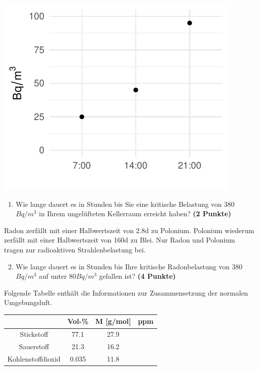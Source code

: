 \documentclass[a4paper, 9pt]{scrartcl}\usepackage[]{graphicx}\usepackage[]{xcolor}
\makeatletter
\def\maxwidth{ %
  \ifdim\Gin@nat@width>\linewidth
    \linewidth
  \else
    \Gin@nat@width
  \fi
}
\newenvironment{knitrout}{}{} %
\makeatother
\begin{document}
\begin{knitrout}
\color{fgcolor}

{\centering \includegraphics[width=\maxwidth]{img/math-10-1} 

}


\end{knitrout}

\vspace{-0.75cm}

\begin{enumerate}
\item Wie lange dauert es in Stunden bis Sie eine kritische Belastung von
  380$Bq/m^3$ in Ihrem ungelüfteten Kellerraum erreicht haben?
  \textbf{(2 Punkte)}
\end{enumerate}

Radon zerfällt mit einer Halbwertszeit von 2.8d zu
Polonium. Polonium wiederum zerfällt mit einer Halbwertszeit von
160d zu Blei. Nur Radon und Polonium tragen zur
radioaktiven Strahlenbelastung bei.

\begin{enumerate}
  \setcounter{enumi}{1}
\item Wie lange dauert es in Stunden bis Ihre kritische Radonbelastung von
  380$Bq/m^3$ auf unter 80$Bq/m^3$ gefallen ist?
  \textbf{(4 Punkte)}
\end{enumerate}

Folgende Tabelle enthält die Informationen zur Zusammensetzung der
normalen Umgebungsluft.

\begin{center}
  \begin{tabular}{ c|c|c|c }
     & Vol-\% & M [g/mol] & ppm \\
    \hline
    Stickstoff & 77.1 & 27.9 &
                                                    \phantom{1000000000000}\strut\\
        \hline
    Sauerstoff & 21.3 & 16.2 &
                                                    \phantom{10000000}\strut\\
        \hline
    Kohlenstoffdioxid & 0.035 & 11.8 & \phantom{10000000}\strut\\     
     \hline
\end{tabular}
\end{center}
\end{document}
